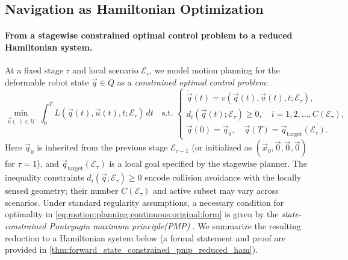 


\subsection{Navigation as Hamiltonian Optimization}
\label{subsec:problem_formulation}
\paragraph{From a stagewise constrained optimal control problem to a reduced Hamiltonian system.}
At a fixed stage $\tau$ and local scenario $\mathcal E_\tau$, we model motion planning for the deformable robot state
$\vec q\in Q$ as a \emph{constrained optimal control problem}:
\begin{equation}
\label{eq:motion:planning:continuous:original:form}
\min_{\vec u(\cdot)\in\mathcal U}\ \int_0^{T} L(\vec q(t),\vec u(t),t;\mathcal E_\tau)\,dt
\quad
\text{s.t.}\;
\begin{cases}
\dot{\vec q}(t)= v(\vec q(t),\vec u(t),t;\mathcal E_\tau), \\
d_i(\vec q(t);\mathcal E_\tau)\ge 0,\quad i=1,2,\ldots, C(\mathcal E_\tau), \\
\vec q(0)=\vec q_0,\quad \vec q(T)=\vec q_{\text{target}}(\mathcal E_\tau).
\end{cases}
\end{equation}
Here $\vec q_0$ is inherited from the previous stage $\mathcal E_{\tau-1}$ (or initialized as $(\vec x_0,\vec 0,\vec 0,\vec 0)$ for $\tau=1$),
and $\vec q_{\text{target}}(\mathcal E_\tau)$ is a local goal specified by the stagewise planner.
The inequality constraints $d_i(\vec q;\mathcal E_\tau)\ge 0$ encode collision avoidance with the locally sensed geometry;
their number $C(\mathcal E_\tau)$ and active subset may vary across scenarios.
Under standard regularity assumptions, a necessary condition for optimality in \cref{eq:motion:planning:continuous:original:form}
is given by the \emph{state-constrained Pontryagin maximum principle(PMP)} \citep{FERREIRA1994whenpmp, hartl1995survey, pearson1966discrete}.
We summarize the resulting reduction to a Hamiltonian system below (a formal statement and proof are provided in
\cref{thm:forward_state_constrained_pmp_reduced_ham}).

